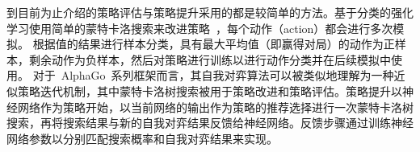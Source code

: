 到目前为止介绍的策略评估与策略提升采用的都是较简单的方法。基于分类的强化学习使用简单的蒙特卡洛搜索来改进策略~\cite{RLC}，每个动作（action）都会进行多次模拟。
根据值的结果进行样本分类，具有最大平均值（即赢得对局）的动作为正样本，剩余动作为负样本，然后对策略进行训练以进行动作分类并在后续模拟中使用。
对于~AlphaGo~系列框架而言，其自我对弈算法可以被类似地理解为一种近似策略迭代机制，其中蒙特卡洛树搜索被用于策略改进和策略评估。策略提升以神经网络作为策略开始，以当前网络的输出作为策略的推荐选择进行一次蒙特卡洛树搜索，再将搜索结果与新的自我对弈结果反馈给神经网络。反馈步骤通过训练神经网络参数以分别匹配搜索概率和自我对弈结果来实现。

